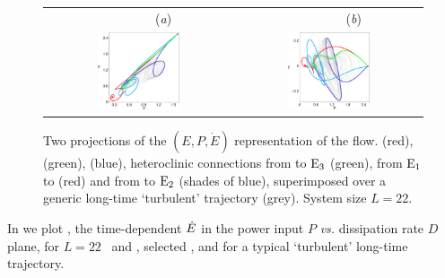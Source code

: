 \begin{figure}[t]
\begin{center}
 \begin{tabular}{cc}
		~~~~~~~~(\textit{a})						&	~~~~~~~~(\textit{b}) \\
	\includegraphics[width=0.46\textwidth]{figs/connEP.eps}		& \includegraphics[width=0.46\textwidth]{figs/connPEdot.eps}
 \end{tabular}
\end{center}
\caption{
Two projections of the $(E,P,\dot{E})$ representation of the flow.
 (red),  (green),  (blue),
heteroclinic connections from  to $\mathrm{E}_{3}$ (green),
from $\mathrm{E}_{1}$ to  (red)
and from  to $\mathrm{E}_{2}$ (shades of blue), superimposed over
a generic long-time `turbulent' trajectory (grey).
System size $L=22$.
        }
\label{f:drivedragConn}
\end{figure}

In  we plot , the time-dependent
$\dot{E}$ in the power input $P$ {\em vs.}
dissipation rate $D$
plane, for $L=22$ \eqva\ and \reqva,
selected \rpo, and for a typical `turbulent' long-time
trajectory.


